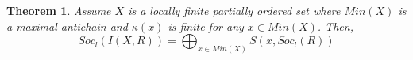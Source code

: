 \documentclass[12pt]{article}
\newtheorem{theorem}{Theorem}[subsection]
\begin{document}
\begin{theorem}
	\label{MinSocle} Assume $X$ is a locally finite partially ordered set where 
	$Min(X)$ is a maximal antichain and $\kappa(x)$ is finite for any $x \in
	Min(X) $. Then, 
	\begin{equation*}
	Soc_l({I(X,R)}) = \bigoplus_{x \in Min(X)} S(x,Soc_l(R))
	\end{equation*}
\end{theorem}
\end{document}
